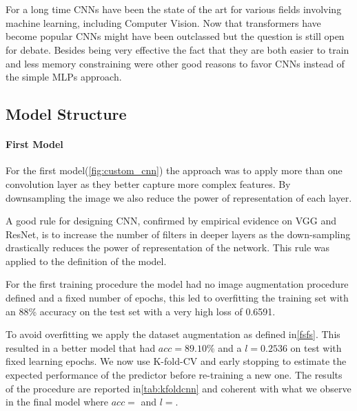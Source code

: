 \\

\paragraph{}
For a long time CNNs have been the state of the art for various fields involving machine learning, including Computer Vision.
Now that transformers have become popular CNNs might have been outclassed but the question is still open for debate.\cite{wang2023cnns}
Besides being very effective the fact that they are both easier to train and less memory constraining were other good reasons
to favor CNNs instead of the simple MLPs approach.

\subsection{Model Structure}

\paragraph{First Model}
For the first model(\ref{fig:custom_cnn}) the approach was to apply more than one convolution layer as they better
capture more complex features. By downsampling the image we also reduce the power of representation of each layer.

A good rule for designing CNN, confirmed by empirical evidence on VGG and ResNet, is to increase the number of filters
in deeper layers as the down-sampling drastically reduces the power of representation of the network.
This rule was applied to the definition of the model.

For the first training procedure the model had no image augmentation procedure defined and a fixed number of epochs, this
led to overfitting the training set with an 88\% accuracy on the test set with a very high loss of 0.6591.

To avoid overfitting we apply the dataset augmentation as defined in\ref{fsfs}.
This resulted in a better model that had $acc=89.10\%$ and a $l=0.2536$ on test with fixed learning epochs.
We now use K-fold-CV and early stopping to estimate the expected performance of the predictor before re-training a new one.
The results of the procedure are reported in\ref{tab:kfoldcnn} and coherent with what we observe in the final model
where $acc=$ and $l=$.


